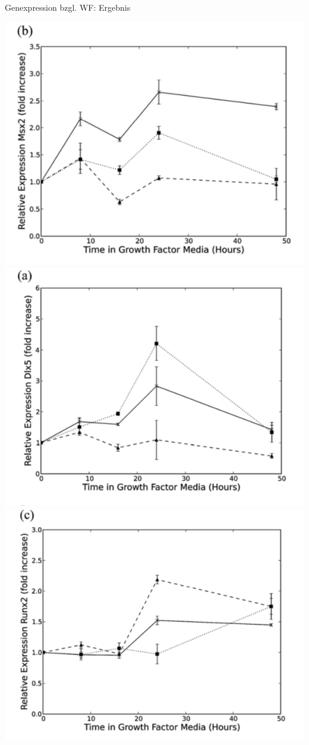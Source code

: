 \documentclass[]{beamer}
\begin{document}
\begin{frame}{Genexpression bzgl. WF: Ergebnis}
\begin{center}
			\includegraphics[scale=0.18]{Expression_Msx2.jpg}
			\includegraphics[scale=0.18]{Expression_Dlx5.jpg}
			\includegraphics[scale=0.18]{Expression_Runx2.jpg}

\end{center}
\end{frame}
\end{document}
